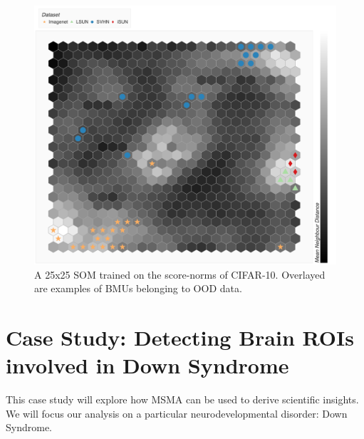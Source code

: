 \begin{figure}[tbhp]
\centering
\includegraphics[width=\textwidth]{figures/cifar_som_hex.png}
\caption{A 25x25 SOM trained on the score-norms of CIFAR-10. Overlayed are examples of BMUs belonging to OOD data.}
\label{fig:som-cifar}
\end{figure}





\section{Case Study: Detecting Brain ROIs involved in Down Syndrome}

This case study will explore how MSMA can be used to derive scientific insights. We will focus our analysis on a particular neurodevelopmental disorder: Down Syndrome. 


